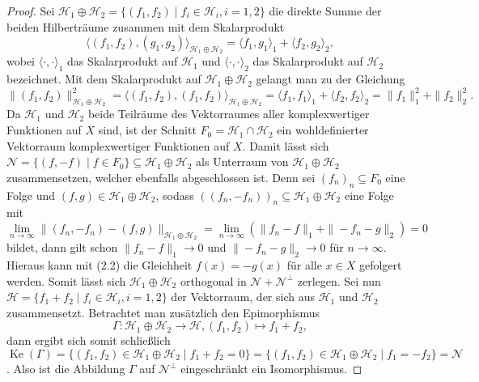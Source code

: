 \documentclass[12pt,titlepage,twoside,cleardoublepage]{article}
\theoremstyle{nummermitklammern}
\numberwithin{equation}{section}
\DeclareMathOperator{\Ke}{Ke}
\begin{document}
\begin{proof}
Sei $\mathcal{H}_1\oplus \mathcal{H}_2=\{(f_1,f_2)\mid f_i\in \mathcal{H}_i,i=1,2\}$ die direkte Summe der beiden Hilberträume zusammen mit dem Skalarprodukt 
\[
\langle (f_1,f_2),(g_1,g_2) \rangle_{\mathcal{H}_1\oplus \mathcal{H}_2}=\langle f_1,g_1 \rangle_1+ \langle f_2,g_2\rangle_2,
\] 
wobei $\langle \cdot, \cdot \rangle_1$ das Skalarprodukt auf $\mathcal{H}_1$ und $\langle \cdot, \cdot \rangle_2$ das Skalarprodukt auf $\mathcal{H}_2$ bezeichnet. Mit dem Skalarprodukt auf $\mathcal{H}_1\oplus \mathcal{H}_2$ gelangt man zu der Gleichung 
\[
\|(f_1,f_2)\|_{\mathcal{H}_1\oplus \mathcal{H}_2}^2 =\langle (f_1,f_2),(f_1,f_2) \rangle_{\mathcal{H}_1\oplus \mathcal{H}_2}=\langle f_1,f_1 \rangle_1+ \langle f_2,f_2\rangle_2=\|f_1\|_1^2+\|f_2\|_2^2.
\] 
Da $\mathcal{H}_1$ und $\mathcal{H}_2$ beide Teilräume des Vektorraumes aller komplexwertiger Funktionen auf $X$ sind, ist der Schnitt $F_{0}=\mathcal{H}_1\cap \mathcal{H}_2$ ein wohldefinierter Vektorraum komplexwertiger Funktionen auf $X$.
Damit lässt sich $\mathcal{N}=\{(f,-f) \mid f\in F_{0}\}\subseteq \mathcal{H}_1\oplus \mathcal{H}_2$ als Unterraum von $\mathcal{H}_1\oplus \mathcal{H}_2$ zusammensetzen, welcher ebenfalls abgeschlossen ist. Denn sei $(f_n)_n\subseteq F_0$ eine Folge und $(f,g)\in \mathcal{H}_1\oplus \mathcal{H}_2$, sodass $((f_n,-f_n))_n\subseteq \mathcal{H}_1\oplus \mathcal{H}_2$ eine Folge mit 
\[
\underset{n\to \infty}{\lim}\|(f_n,-f_n)-(f,g)\|_{\mathcal{H}_1\oplus \mathcal{H}_2}=\underset{n\to \infty}{\lim}(\|f_n-f\|_1+\|-f_n-g\|_2)= 0
\]
 bildet, dann gilt schon $\|f_n-f\|_1{\to} 0$ und $\|-f_n-g\|_2{\to} 0$ für $n\rightarrow\infty.$ Hieraus kann mit (2.2) die Gleichheit $f(x)=-g(x)$ für alle $x\in X$ gefolgert werden. Somit lässt sich $\mathcal{H}_1\oplus \mathcal{H}_2$ orthogonal in $\mathcal{N} + \mathcal{N}^{\bot}$ zerlegen.
Sei nun $\mathcal{H}=\{f_1+f_2\mid f_i\in \mathcal{H}_i,i=1,2\}$ der Vektorraum, der  sich aus $\mathcal{H}_1$ und $\mathcal{H}_2$ zusammensetzt. Betrachtet man zusätzlich den Epimorphismus 
\[
\Gamma:\mathcal{H}_1 \oplus \mathcal{H}_2\to \mathcal{H},(f_1,f_2) \mapsto f_1+f_2,
\]
 dann ergibt sich somit schließlich $
 \Ke(\Gamma)=\{(f_1,f_2)\in \mathcal{H}_1\oplus \mathcal{H}_2\mid f_1+f_2=0\}=\{(f_1,f_2)\in \mathcal{H}_1\oplus \mathcal{H}_2\mid f_1=-f_2\}=\mathcal{N}$.
  Also ist die Abbildung $\Gamma$ auf $\mathcal{N}^{\bot}$ eingeschränkt ein Isomorphismus.

\end{proof}
\end{document}

